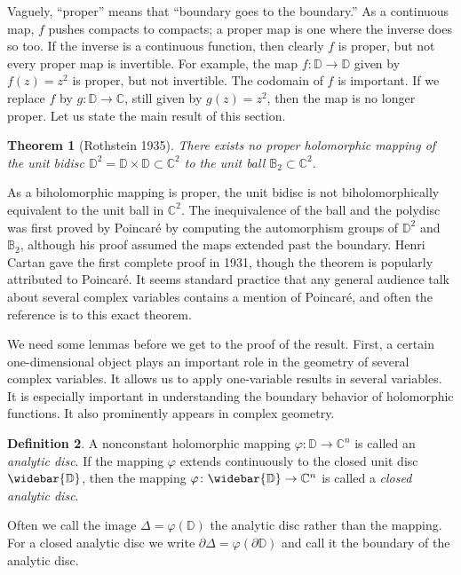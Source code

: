 \documentclass[12pt,openany]{book}
\newcommand{\C}{{\mathbb{C}}}
\newcommand{\D}{{\mathbb{D}}}
\newcommand{\bB}{{\mathbb{B}}}
\newcommand{\myindex}[1]{#1\index{#1}}
\theoremstyle{plain}
\newtheorem{thm}{Theorem}[section]
\theoremstyle{remark}
\theoremstyle{definition}
\newtheorem{defn}[thm]{Definition}
\theoremstyle{exercise}
\theoremstyle{example}
\begin{document}
Vaguely, ``proper'' means that ``boundary goes to the boundary.''
As a continuous map, $f$ pushes compacts to compacts; a proper map is
one where the inverse does so too.  If the inverse is a continuous
function, then clearly $f$ is proper,
but not every proper map is invertible.
For example, the map $f \colon \D \to \D$ given by $f(z) = z^2$ is proper,
but not invertible.  The codomain of $f$ is important.
If we replace $f$ by $g \colon \D \to \C$, still given by $g(z)=z^2$,
then the map is
no longer proper.  Let us state the main result of this section.

\begin{thm}[Rothstein 1935] \label{thm:Rothstein}
There exists no proper holomorphic mapping of the unit bidisc $\D^2 = \D \times \D
\subset \C^2$ to the unit ball $\bB_2 \subset \C^2$.
\end{thm}

As a biholomorphic mapping is proper,
the unit bidisc is not biholomorphically
equivalent to the unit ball in $\C^2$.
The inequivalence of the ball and the polydisc was first proved by
Poincar\'e by computing the automorphism groups of $\D^2$ and $\bB_2$,
although his proof
assumed the maps extended past the boundary.
Henri Cartan gave the
first complete proof in 1931, though the theorem is
popularly attributed to Poincar\'e.  It seems standard practice that any general audience talk
about several complex variables contains a mention of Poincar\'e,
and often the reference is to this exact theorem.

We need some lemmas before we get to the proof of the result.  First,
a certain one-dimensional object plays an important role in the geometry
of several complex variables.  It allows us to apply one-variable
results in several variables.  It is especially important in
understanding the boundary behavior of holomorphic functions.  It also
prominently appears in complex geometry.

\begin{defn}
A nonconstant holomorphic mapping
$\varphi \colon \D \to \C^n$ is called an \emph{\myindex{analytic disc}}.
If the mapping $\varphi$ extends continuously to the closed unit disc
$\widebar{\D}$, then the mapping
$\varphi \colon \widebar{\D} \to \C^n$ is called
a \emph{\myindex{closed analytic disc}}.

Often we call the image $\Delta = \varphi(\D)$ the analytic disc
rather than the mapping.  For a closed analytic disc we write
$\partial \Delta = \varphi( \partial \D)$ and call it the boundary
of the analytic disc.
\end{defn}
\end{document}
